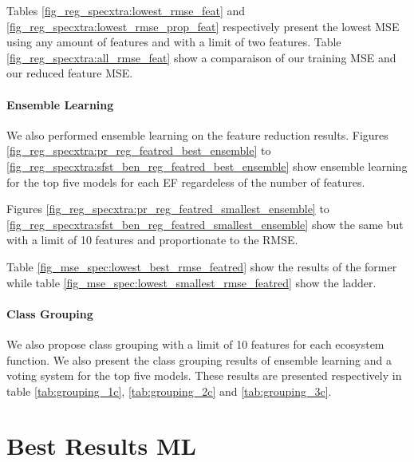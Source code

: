 \documentclass[12pt,letterpaper]{article}
\begin{document}
Tables \ref{fig_reg_specxtra:lowest_rmse_feat} and \ref{fig_reg_specxtra:lowest_rmse_prop_feat} respectively present the lowest MSE using any amount of features and with a limit of two features.
Table \ref{fig_reg_specxtra:all_rmse_feat} show a comparaison of our training MSE and our reduced feature MSE.


\paragraph{Ensemble Learning}
We also performed ensemble learning on the feature reduction results.
Figures \ref{fig_reg_specxtra:pr_reg_featred_best_ensemble} to \ref{fig_reg_specxtra:sfst_ben_reg_featred_best_ensemble} show ensemble learning for the top five models for each \ac{EF} regardeless of the number of features.


Figures \ref{fig_reg_specxtra:pr_reg_featred_smallest_ensemble} to \ref{fig_reg_specxtra:sfst_ben_reg_featred_smallest_ensemble} show the same but with a limit of 10 features and proportionate to the RMSE.




Table \ref{fig_mse_spec:lowest_best_rmse_featred} show the results of the former while table \ref{fig_mse_spec:lowest_smallest_rmse_featred} show the ladder.


\paragraph{Class Grouping}
We also propose class grouping with a limit of 10 features for each ecosystem function.
We also present the class grouping results of ensemble learning and a voting system for the top five models.
These results are presented respectively in table \ref{tab:grouping_1c}, \ref{tab:grouping_2c} and \ref{tab:grouping_3c}.


\clearpage
\section{Best Results ML}
\end{document}
